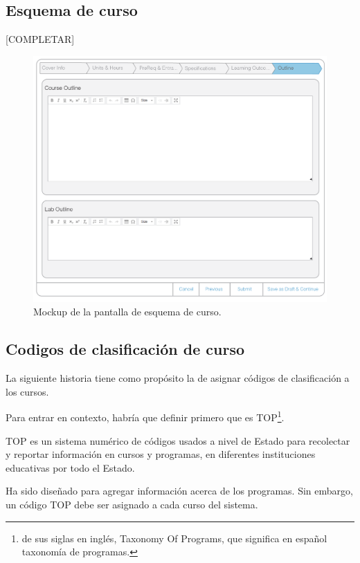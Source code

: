 \subsection{Esquema de curso}
[COMPLETAR]

\begin{figure}[H]
\centering
\includegraphics[scale=0.3]{Capitulos/DesarrollodelaAplicacion/Imagenes/course_outline}
\caption{Mockup de la pantalla de esquema de curso.}
  \label{course_outline}
\end{figure}

\subsection{Codigos de clasificación de curso}
La siguiente historia tiene como propósito la de asignar códigos de clasificación a los cursos.

Para entrar en contexto, habría que definir primero que es TOP\footnote{de sus siglas en inglés, Taxonomy Of Programs, que significa en español taxonomía de programas.}.

TOP es un sistema numérico de códigos usados a nivel de Estado para recolectar y reportar información en cursos y programas, en diferentes instituciones educativas \citep{brice_w_harris_program_2013} por todo el Estado. 

Ha sido diseñado para agregar información acerca de los programas. Sin embargo, un código TOP debe ser asignado a cada curso del sistema. 

